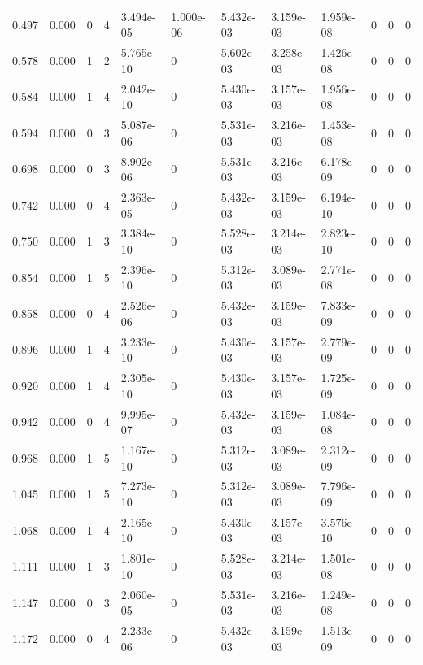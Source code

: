 \documentclass[preview]{standalone}
\begin{document}
{{\begin{tabular}{L{1.2cm}C{1.2cm} C{0.3cm}C{0.5cm} C{1.4cm}C{1.4cm} C{1.4cm}C{1.4cm} C{1.6cm}C{1.6cm} C{1.6cm}C{1.6cm}}
  0.497  &  0.000  & 0     &  4 &  3.494e-05  & 1.000e-06  &  5.432e-03&   3.159e-03& 1.959e-08 & 0   &  0 & 0  \\ 
  0.578  &  0.000  & 1     &  2 &  5.765e-10  & 0  &  5.602e-03&   3.258e-03& 1.426e-08 & 0   &  0 & 0  \\ 
  0.584  &  0.000  & 1     &  4 &  2.042e-10  & 0  &  5.430e-03&   3.157e-03& 1.956e-08 & 0   &  0 & 0  \\ 
  0.594  &  0.000  & 0     &  3 &  5.087e-06  & 0  &  5.531e-03&   3.216e-03& 1.453e-08 & 0   &  0 & 0  \\ 
  0.698  &  0.000  & 0     &  3 &  8.902e-06  & 0  &  5.531e-03&   3.216e-03& 6.178e-09 & 0   &  0 & 0  \\ 
  0.742  &  0.000  & 0     &  4 &  2.363e-05  & 0  &  5.432e-03&   3.159e-03& 6.194e-10 & 0   &  0 & 0  \\ 
  0.750  &  0.000  & 1     &  3 &  3.384e-10  & 0  &  5.528e-03&   3.214e-03& 2.823e-10 & 0   &  0 & 0  \\ 
  0.854  &  0.000  & 1     &  5 &  2.396e-10  & 0  &  5.312e-03&   3.089e-03& 2.771e-08 & 0   &  0 & 0  \\ 
  0.858  &  0.000  & 0     &  4 &  2.526e-06  & 0  &  5.432e-03&   3.159e-03& 7.833e-09 & 0   &  0 & 0  \\ 
  0.896  &  0.000  & 1     &  4 &  3.233e-10  & 0  &  5.430e-03&   3.157e-03& 2.779e-09 & 0   &  0 & 0  \\ 
  0.920  &  0.000  & 1     &  4 &  2.305e-10  & 0  &  5.430e-03&   3.157e-03& 1.725e-09 & 0   &  0 & 0  \\ 
  0.942  &  0.000  & 0     &  4 &  9.995e-07  & 0  &  5.432e-03&   3.159e-03& 1.084e-08 & 0   &  0 & 0  \\ 
  0.968  &  0.000  & 1     &  5 &  1.167e-10  & 0  &  5.312e-03&   3.089e-03& 2.312e-09 & 0   &  0 & 0  \\ 
  1.045  &  0.000  & 1     &  5 &  7.273e-10  & 0  &  5.312e-03&   3.089e-03& 7.796e-09 & 0   &  0 & 0  \\ 
  1.068  &  0.000  & 1     &  4 &  2.165e-10  & 0  &  5.430e-03&   3.157e-03& 3.576e-10 & 0   &  0 & 0  \\ 
  1.111  &  0.000  & 1     &  3 &  1.801e-10  & 0  &  5.528e-03&   3.214e-03& 1.501e-08 & 0   &  0 & 0  \\ 
  1.147  &  0.000  & 0     &  3 &  2.060e-05  & 0  &  5.531e-03&   3.216e-03& 1.249e-08 & 0   &  0 & 0  \\ 
  1.172  &  0.000  & 0     &  4 &  2.233e-06  & 0  &  5.432e-03&   3.159e-03& 1.513e-09 & 0   &  0 & 0  \\ 

\end{tabular}}}
\end{document}
